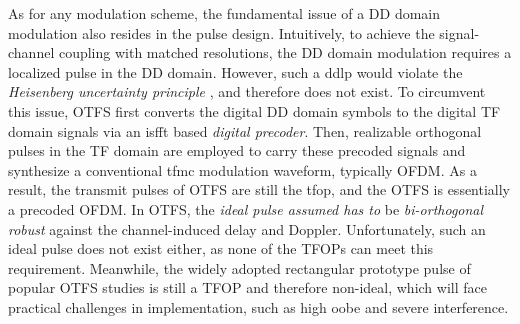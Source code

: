 \documentclass[journal]{IEEEtran}
\begin{document}
As for any modulation scheme, the fundamental issue of a DD domain modulation also resides in the pulse design.
Intuitively, to achieve the signal-channel coupling with matched resolutions, the DD domain modulation requires a localized pulse in the DD domain. However, such a \ac{ddlp} would violate the \emph{Heisenberg uncertainty principle} \cite{hadaniyt}, and therefore does not exist. 
To circumvent this issue, OTFS first converts the digital DD domain symbols to the digital TF domain signals via an \ac{isfft} based \emph{digital precoder}.
Then, realizable orthogonal pulses in the TF domain are employed to carry these precoded signals and synthesize a conventional \ac{tfmc} modulation waveform, typically OFDM\cite{otfs_wcnc_2017}.
As a result, the transmit pulses of OTFS are still the \ac{tfop}, and
the OTFS is essentially a precoded OFDM\cite{zemenpimrc2018}.
In OTFS, the \emph{ideal pulse assumed has to} be \emph{bi-orthogonal robust} against the channel-induced delay and Doppler. Unfortunately, such an ideal pulse does not exist either\cite{hadani_otfs_2018}, as none of the TFOPs can meet this requirement.
Meanwhile, the widely adopted rectangular prototype pulse of popular OTFS studies is still a TFOP and therefore non-ideal, which will face practical challenges in implementation, such as high \ac{oobe} and severe interference\cite{shen2022error}.
\end{document}
